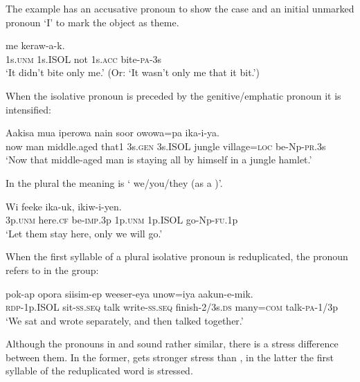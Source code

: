 The example  has an accusative pronoun to show the case and an initial unmarked pronoun  `I' to mark the object as theme.

\ea%
\label{ex:3:x601}
\gll {}  me  keraw-a-k. \\
1s.\textsc{unm} 1s.ISOL not 1s.\textsc{acc} bite-\textsc{pa}-3s\\
\glt`It didn't bite only me.' (Or: `It wasn't only me that it bit.')
\z

When the isolative pronoun is preceded by the genitive/emphatic pronoun it is intensified:

\ea%
\label{ex:3:x1813}
\gll Aakisa mua iperowa nain   soor owowa=pa ika-i-ya.\\
now man middle.aged that1 3s.\textsc{gen} 3s.ISOL jungle village=\textsc{loc} be-Np-\textsc{pr}.3s\\
\glt`Now that middle-aged man is staying all by himself in a jungle hamlet.'
\z

In the plural the meaning is ` we/you/they (as a )'. 

\ea%
\label{ex:3:x602}
\gll Wi feeke ika-uk,   ikiw-i-yen. \\
3p.\textsc{unm} here.\textsc{cf} be-\textsc{imp}.3p 1p.\textsc{unm} 1p.ISOL go-Np-\textsc{fu}.1p\\
\glt`Let them stay here, only we will go.'
\z

When the first syllable of a plural isolative pronoun is reduplicated, the pronoun refers to  in the group:

\ea%
\label{ex:3:x603}
\gll {} pok-ap opora siisim-ep weeser-eya unow=iya aakun-e-mik.\\
\textsc{rdp}-1p.ISOL sit-\textsc{ss}.\textsc{seq} talk write-\textsc{ss}.\textsc{seq} finish-2/3s.\textsc{ds} many=\textsc{com} talk-\textsc{pa}-1/3p\\
\glt`We sat and wrote separately, and then talked together.'
\z

Although the pronouns in  and  sound rather similar, there is a stress difference between them. In the former,  gets stronger stress than , in the latter the first syllable of the reduplicated word is stressed.

